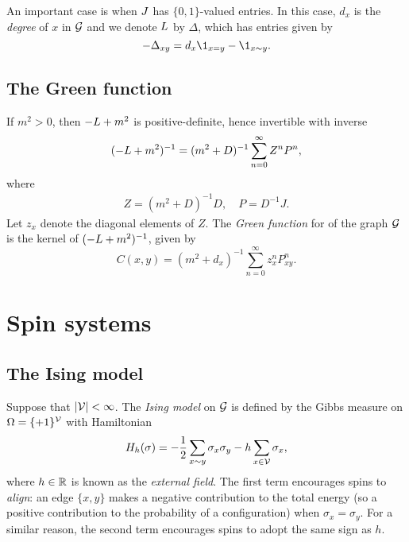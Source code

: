 \begin{example}
An important case is when $J$ has $\{0, 1 \}$-valued entries.
In this case, $d_x$ is the \emph{degree} of $x$ in $\mathcal{G}$ and we denote $L$ by
$\Delta$, which has entries given by
\begin{equation}
\label{e:Deltaxy}
-\Delta_{xy} = d_x \1_{x=y} - \1_{x \sim y}.
\end{equation}
\end{example}


\subsection{The Green function}

If $m^2 > 0$, then $-L + m^2$ is positive-definite, hence invertible with inverse
\begin{equation}
(-L + m^2)^{-1} = (m^2 + D)^{-1} \sum_{n=0}^\infty Z^n P^n,
\end{equation}
where
\begin{align}
Z = (m^2 + D)^{-1} D,
  \quad
P = D^{-1} J.
\end{align}
Let $z_x$ denote the diagonal elements of $Z$. The \emph{Green function} for
of the graph $\mathcal{G}$ is the kernel of $(-L + m^2)^{-1}$, given by
\begin{equation}
\label{e:greendef}
C(x, y)
  =
(m^2 + d_x)^{-1} \sum_{n=0}^\infty z_x^n P^n_{xy}.
\end{equation}


\section{Spin systems}

\subsection{The Ising model}

Suppose that $|\mathcal{V}| < \infty$.
The \emph{Ising model} on $\mathcal{G}$ is defined by the Gibbs measure on $\Omega = \{ + 1 \}^{\mathcal{V}}$
with Hamiltonian
\begin{equation}
H_h(\sigma)
	=
-\frac{1}{2} \sum_{x \sim y} \sigma_x \sigma_y - h \sum_{x\in\mathcal{V}} \sigma_x,
\end{equation}
where $h \in {\mathbb R}$ is known as the \emph{external field}.
The first term encourages spins to \emph{align}: an edge $\{ x, y \}$ makes
a negative contribution to the total energy (so a positive contribution to
the probability of a configuration) when $\sigma_x = \sigma_y$.
For a similar reason, the second term encourages spins to adopt the same sign as $h$.

